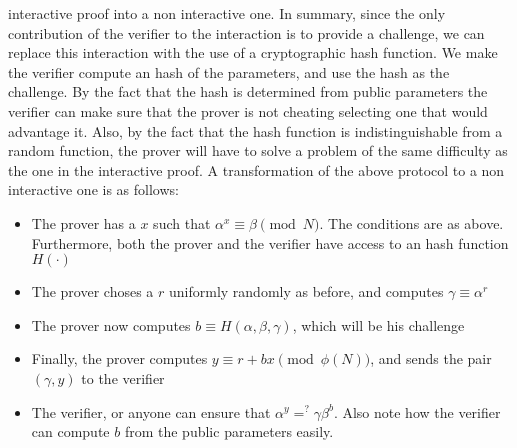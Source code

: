 \documentclass{article}
\begin{document}
interactive proof into a non interactive one. In summary, since the only contribution of the verifier to the interaction 
is to provide a challenge, we can replace this interaction with the use of a cryptographic hash function.
We make the verifier compute an hash of the parameters, and use the hash as the challenge. By the fact that 
the hash is determined from public parameters the verifier can make sure that the prover is not cheating selecting one 
that would advantage it. Also, by the fact that the hash function is indistinguishable from a random function, the prover 
will have to solve a problem of the same difficulty as the one in the interactive proof. A transformation of the above protocol 
to a non interactive one is as follows:
\begin{itemize}
    \item The prover has a $x$ such that $\alpha^x \equiv \beta \pmod N$. The conditions are as above.
         Furthermore, both the prover and the verifier have access to an hash function $H(\cdot)$
    \item The prover choses a $r$ uniformly randomly as before, and computes $\gamma \equiv \alpha^r$
    \item The prover now computes $b \equiv H(\alpha, \beta, \gamma)$, which will be his challenge
    \item Finally, the prover computes $y \equiv r + bx \pmod{\phi(N)}$, and sends the pair $(\gamma, y)$ to the verifier
    \item The verifier, or anyone can ensure that $ \alpha^y =^? \gamma \beta^b$. Also note how the verifier can compute 
          $b$ from the public parameters easily. 
\end{itemize}
\end{document}

